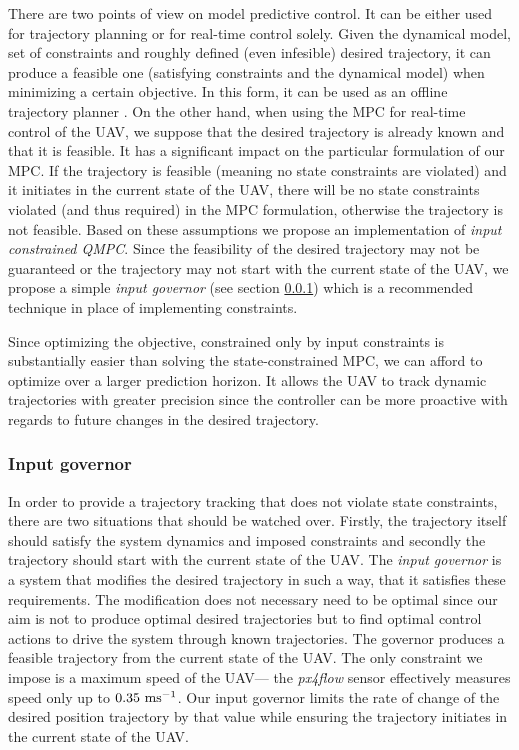 There are two points of view on model predictive control. It can be either used for trajectory planning or for real-time control solely. Given the dynamical model, set of constraints and roughly defined (even infesible) desired trajectory, it can produce a feasible one (satisfying constraints and the dynamical model) when minimizing a certain objective. In this form, it can be used as an offline trajectory planner \citep{saska2014formations}. On the other hand, when using the MPC for real-time control of the UAV, we suppose that the desired trajectory is already known and that it is feasible. It has a significant impact on the particular formulation of our MPC. If the trajectory is feasible (meaning no state constraints are violated) and it initiates in the current state of the UAV, there will be no state constraints violated (and thus required) in the MPC formulation, otherwise the trajectory is not feasible. Based on these assumptions we propose an implementation of \emph{input constrained QMPC}. Since the feasibility of the desired trajectory may not be guaranteed or the trajectory may not start with the current state of the UAV, we propose a simple \emph{input governor} (see section \ref{cap:input_governor}) which is a recommended technique \citep{rossiter2013mpcpracticalapproach} in place of implementing constraints.

Since optimizing the objective, constrained only by input constraints is substantially easier than solving the state-constrained MPC, we can afford to optimize over a larger prediction horizon. It allows the UAV to track dynamic trajectories with greater precision since the controller can be more proactive with regards to future changes in the desired trajectory.  


\subsubsection{Input governor}
\label{cap:input_governor}

In order to provide a trajectory tracking that does not violate state constraints, there are two situations that should be watched over. Firstly, the trajectory itself should satisfy the system dynamics and imposed constraints and secondly the trajectory should start with the current state of the UAV. The \emph{input governor} is a system that modifies the desired trajectory in such a way, that it satisfies these requirements. The modification does not necessary need to be optimal since our aim is not to produce optimal desired trajectories but to find optimal control actions to drive the system through known trajectories. The governor produces a feasible trajectory from the current state of the UAV. The only constraint we impose is a maximum speed of the UAV--- the \emph{px4flow} sensor effectively measures speed only up to $0.35~\mathrm{ms^{-1}}$. Our input governor limits the rate of change of the desired position trajectory by that value while ensuring the trajectory initiates in the current state of the UAV.

